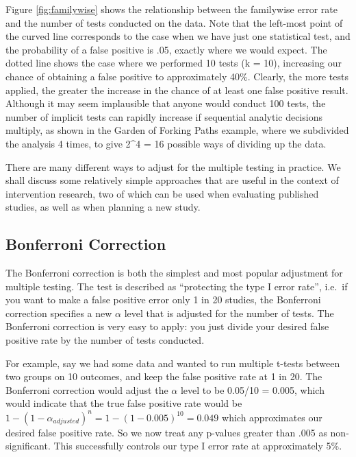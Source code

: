 \documentclass{krantz}
\begin{document}
Figure \ref{fig:familywise} shows the relationship between the familywise error rate and the number of tests conducted on the data. Note that the left-most point of the curved line corresponds to the case when we have just one statistical test, and the probability of a false positive is .05, exactly where we would expect. The dotted line shows the case where we performed 10 tests (k = 10), increasing our chance of obtaining a false positive to approximately 40\%. Clearly, the more tests applied, the greater the increase in the chance of at least one false positive result. Although it may seem implausible that anyone would conduct 100 tests, the number of implicit tests can rapidly increase if sequential analytic decisions multiply, as shown in the Garden of Forking Paths example, where we subdivided the analysis 4 times, to give 2\^{}4 = 16 possible ways of dividing up the data.

There are many different ways to adjust for the multiple testing in practice. We shall discuss some relatively simple approaches that are useful in the context of intervention research, two of which can be used when evaluating published studies, as well as when planning a new study.

\hypertarget{bonferroni-correction}{%
\subsection{Bonferroni Correction}\label{bonferroni-correction}}

The Bonferroni correction is both the simplest and most popular adjustment for multiple testing. The test is described as ``protecting the type I error rate'', i.e.~if you want to make a false positive error only 1 in 20 studies, the Bonferroni correction specifies a new \(\alpha\) level that is adjusted for the number of tests. The Bonferroni correction is very easy to apply: you just divide your desired false positive rate by the number of tests conducted.

For example, say we had some data and wanted to run multiple t-tests between two groups on 10 outcomes, and keep the false positive rate at 1 in 20. The Bonferroni correction would adjust the \(\alpha\) level to be 0.05/10 = 0.005, which would indicate that the true false positive rate would be \(1-(1-\alpha_{adjusted})^{n} = 1-(1-0.005)^{10} = 0.049\) which approximates our desired false positive rate. So we now treat any p-values greater than .005 as non-significant. This successfully controls our type I error rate at approximately 5\%.
\end{document}
